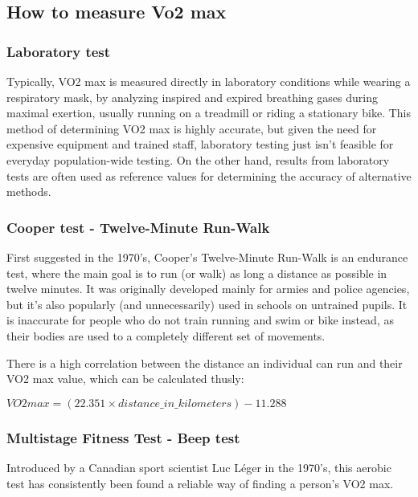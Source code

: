 \subsection{How to measure Vo2 max}

\subsubsection*{Laboratory test}

Typically, VO2 max is measured directly in laboratory conditions while wearing a respiratory mask, by analyzing inspired and expired breathing gases during maximal exertion,\cite{vo2max-definition} usually running on a treadmill or riding a stationary bike.
This method of determining VO2 max is highly accurate, but given the need for expensive equipment and trained staff, laboratory testing just isn't feasible for everyday population-wide testing.
On the other hand, results from laboratory tests are often used as reference values for determining the accuracy of alternative methods.

\subsubsection*{Cooper test - Twelve-Minute Run-Walk}

First suggested in the 1970's, Cooper's Twelve-Minute Run-Walk is an endurance test, where the main goal is to run (or walk) as long a distance as possible in twelve minutes.
It was originally developed mainly for armies and police agencies, but it's also popularly (and unnecessarily\cite{cooper-pupils}) used in schools on untrained pupils.
It is inaccurate for people who do not train running and swim or bike instead, as their bodies are used to a completely different set of movements.

There is a high correlation between the distance an individual can run and their VO2 max value, which can be calculated thusly:

$VO2max = (22.351 \times distance\_in\_kilometers) - 11.288$\cite{cooper-vo2max}

\subsubsection*{Multistage Fitness Test - Beep test}

Introduced by a Canadian sport scientist Luc Léger in the 1970's, this aerobic test has consistently been found a reliable way of finding a person's VO2 max.

